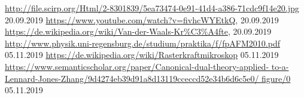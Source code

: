\begin{thebibliography}{xxx}
        \url{http://file.scirp.org/Html/2-8301839/5ea73474-0e91-41d4-a386-71cdc9f14e20.jpg}
        20.09.2019
        \url{https://www.youtube.com/watch?v=fivhcWYEtkQ},
		20.09.2019
        \url{https://de.wikipedia.org/wiki/Van-der-Waals-Kr%C3%A4fte},
		20.09.2019
        \url{http://www.physik.uni-regensburg.de/studium/praktika/f/fpAFM2010.pdf}
        05.11.2019
        \url{https://de.wikipedia.org/wiki/Rasterkraftmikroskop}
        05.11.2019
        \url{https://www.semanticscholar.org/paper/Canonical-dual-theory-applied-
             to-a-Lennard-Jones-Zhang/9d4274eb39d91a8d13119cceccd52e34b6d6c5e0/
             figure/0}
        05.11.2019
\end{thebibliography}
 

